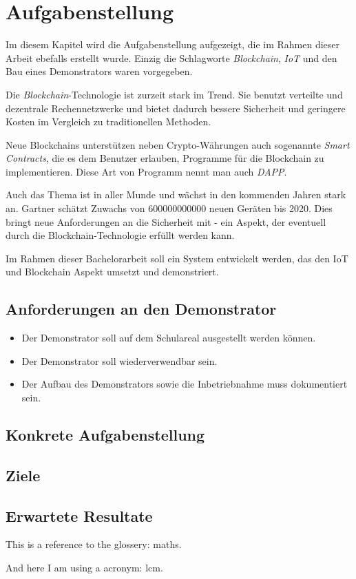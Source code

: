 \chapter{Aufgabenstellung}
\label{cha:Aufgabenstellung}

Im diesem Kapitel wird die Aufgabenstellung aufgezeigt, die im Rahmen dieser 
Arbeit ebefalls erstellt wurde. Einzig die Schlagworte \emph{Blockchain},
\emph{\acrfull{IoT}} und den Bau eines Demonstrators waren vorgegeben.

Die \emph{Blockchain}-Technologie ist zurzeit stark im Trend. Sie benutzt verteilte
und dezentrale Rechennetzwerke und bietet dadurch bessere Sicherheit und geringere 
Kosten im Vergleich zu traditionellen Methoden.

Neue Blockchains unterstützen neben Crypto-Währungen auch sogenannte \emph{Smart Contracts},
die es dem Benutzer erlauben, Programme für die Blockchain zu implementieren. Diese
Art von Programm nennt man auch \emph{\acrfull{DAPP}}.

Auch das Thema  ist in aller Munde und wächst in den kommenden Jahren stark an. Gartner 
schätzt Zuwachs von 600000000000 neuen Geräten bis 2020. Dies bringt neue Anforderungen an
die Sicherheit mit - ein Aspekt, der eventuell durch die Blockchain-Technologie erfüllt
werden kann.

Im Rahmen dieser Bachelorarbeit soll ein System entwickelt werden, das den IoT und Blockchain Aspekt
umsetzt und demonstriert.

\section{Anforderungen an den Demonstrator}
\label{sec:Anforderungen an den Demonstrator}
\begin{itemize}
    \item Der Demonstrator soll auf dem Schulareal ausgestellt werden können. 
    \item Der Demonstrator soll wiederverwendbar sein.
    \item Der Aufbau des Demonstrators sowie die Inbetriebnahme muss dokumentiert sein.
\end{itemize}

\section{Konkrete Aufgabenstellung}
\label{sec:Konkrete Aufgabenstellung}


\section{Ziele}
\label{sec:Ziele}

\section{Erwartete Resultate}
\label{sec:Erwartete_Resultate}

This is a reference to the glossery: \gls{maths}.

And here I am using a acronym: \acrfull{lcm}.